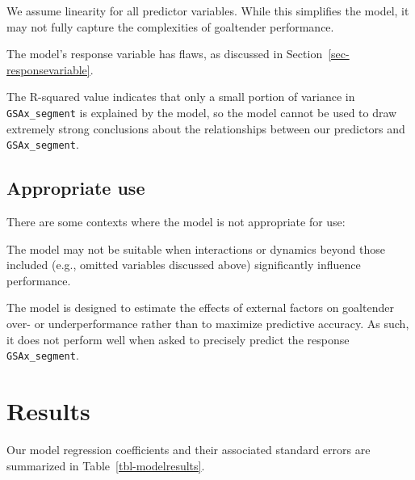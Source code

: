 \documentclass[
  letterpaper,
  DIV=11,
  numbers=noendperiod]{scrartcl}
\begin{document}
We assume linearity for all predictor variables. While this simplifies
the model, it may not fully capture the complexities of goaltender
performance.

The model's response variable has flaws, as discussed in
Section~\ref{sec-responsevariable}.

The R-squared value indicates that only a small portion of variance in
\texttt{GSAx\_segment} is explained by the model, so the model cannot be
used to draw extremely strong conclusions about the relationships
between our predictors and \texttt{GSAx\_segment}.

\subsection{Appropriate use}\label{appropriate-use}

There are some contexts where the model is not appropriate for use:

The model may not be suitable when interactions or dynamics beyond those
included (e.g., omitted variables discussed above) significantly
influence performance.

The model is designed to estimate the effects of external factors on
goaltender over- or underperformance rather than to maximize predictive
accuracy. As such, it does not perform well when asked to precisely
predict the response \texttt{GSAx\_segment}.

\section{Results}\label{sec-results}

Our model regression coefficients and their associated standard errors
are summarized in Table~\ref{tbl-modelresults}.
\end{document}
